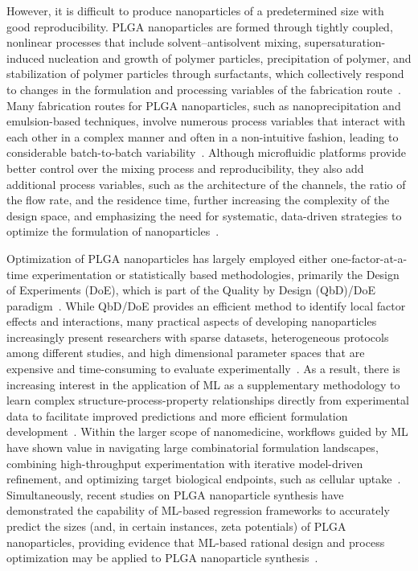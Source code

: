 \documentclass[10pt]{NSP1}
\begin{document}
However, it is difficult to produce nanoparticles of a predetermined size with good
reproducibility. PLGA nanoparticles are formed through tightly coupled, nonlinear processes that
include solvent--antisolvent mixing, supersaturation-induced nucleation and growth of polymer
particles, precipitation of polymer, and stabilization of polymer particles through surfactants,
which collectively respond to changes in the formulation and processing variables of the fabrication
route~\cite{ref9,ref10}. Many fabrication routes for PLGA nanoparticles, such as nanoprecipitation
and emulsion-based techniques, involve numerous process variables that interact with each other in
a complex manner and often in a non-intuitive fashion, leading to considerable batch-to-batch
variability~\cite{ref11,ref12}. Although microfluidic platforms provide better control over the
mixing process and reproducibility, they also add additional process variables, such as the
architecture of the channels, the ratio of the flow rate, and the residence time, further increasing
the complexity of the design space, and emphasizing the need for systematic, data-driven strategies
to optimize the formulation of nanoparticles~\cite{ref13,ref14}.

Optimization of PLGA nanoparticles has largely employed either one-factor-at-a-time experimentation
or statistically based methodologies, primarily the Design of Experiments (DoE), which is part of
the Quality by Design (QbD)/DoE paradigm~\cite{ref15}. While QbD/DoE provides an efficient method
to identify local factor effects and interactions, many practical aspects of developing nanoparticles
increasingly present researchers with sparse datasets, heterogeneous protocols among different
studies, and high dimensional parameter spaces that are expensive and time-consuming to evaluate
experimentally~\cite{ref10,ref12}. As a result, there is increasing interest in the application of
ML as a supplementary methodology to learn complex structure-process-property relationships directly
from experimental data to facilitate improved predictions and more efficient formulation
development~\cite{ref16,ref17}. Within the larger scope of nanomedicine, workflows guided by ML
have shown value in navigating large combinatorial formulation landscapes, combining high-throughput
experimentation with iterative model-driven refinement, and optimizing target biological endpoints,
such as cellular uptake~\cite{ref18}. Simultaneously, recent studies on PLGA nanoparticle synthesis
have demonstrated the capability of ML-based regression frameworks to accurately predict the sizes
(and, in certain instances, zeta potentials) of PLGA nanoparticles, providing evidence that
ML-based rational design and process optimization may be applied to PLGA nanoparticle
synthesis~\cite{ref19,ref20}.
\end{document}
